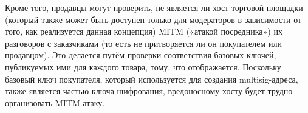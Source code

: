 Кроме того, продавцы могут проверить, не является ли хост торговой площадки (который также может быть доступен только для модераторов в зависимости от того, как реализуется данная концепция) MITM («атакой посредника») их разговоров с заказчиками (то есть не притворяется ли он покупателем или продавцом). Это делается путём проверки соответствия базовых ключей, публикуемых ими для каждого товара, тому, что отображается. Поскольку базовый ключ покупателя, который используется для создания multisig-адреса, также явля\-ется частью ключа шифрования, вредоносному хосту будет трудно организовать MITM-атаку.